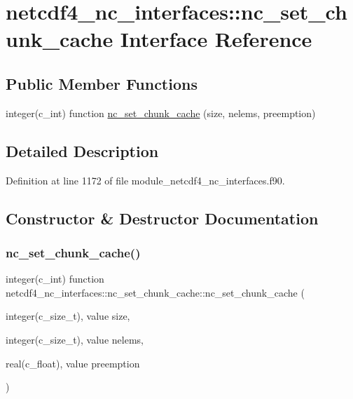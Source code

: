 \hypertarget{interfacenetcdf4__nc__interfaces_1_1nc__set__chunk__cache}{}\section{netcdf4\+\_\+nc\+\_\+interfaces\+:\+:nc\+\_\+set\+\_\+chunk\+\_\+cache Interface Reference}
\label{interfacenetcdf4__nc__interfaces_1_1nc__set__chunk__cache}
\subsection*{Public Member Functions}
\begin{DoxyCompactItemize}
\item 
integer(c\+\_\+int) function \hyperlink{interfacenetcdf4__nc__interfaces_1_1nc__set__chunk__cache_afef97fa38f5b136a181bc6e86462b011}{nc\+\_\+set\+\_\+chunk\+\_\+cache} (size, nelems, preemption)
\end{DoxyCompactItemize}


\subsection{Detailed Description}


Definition at line 1172 of file module\+\_\+netcdf4\+\_\+nc\+\_\+interfaces.\+f90.



\subsection{Constructor \& Destructor Documentation}
\mbox{\label{interfacenetcdf4__nc__interfaces_1_1nc__set__chunk__cache_afef97fa38f5b136a181bc6e86462b011}} 
\subsubsection{\texorpdfstring{nc\+\_\+set\+\_\+chunk\+\_\+cache()}{nc\_set\_chunk\_cache()}}
{\footnotesize\ttfamily integer(c\+\_\+int) function netcdf4\+\_\+nc\+\_\+interfaces\+::nc\+\_\+set\+\_\+chunk\+\_\+cache\+::nc\+\_\+set\+\_\+chunk\+\_\+cache (\begin{DoxyParamCaption}\item[{integer(c\+\_\+size\+\_\+t), value}]{size,  }\item[{integer(c\+\_\+size\+\_\+t), value}]{nelems,  }\item[{real(c\+\_\+float), value}]{preemption }\end{DoxyParamCaption})}



